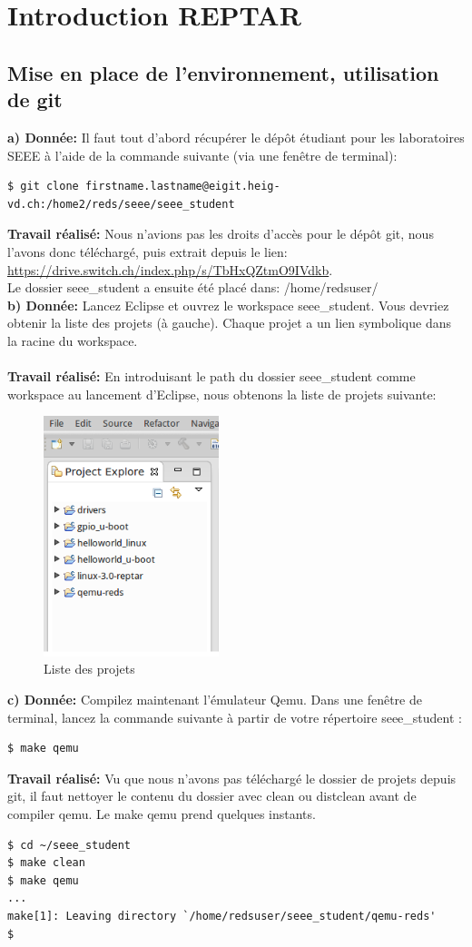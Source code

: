 \newpage
\section{Introduction REPTAR}
\subsection{Mise en place de l'environnement, utilisation de git}
\textbf{a) Donnée: }Il faut tout d'abord récupérer le dépôt étudiant pour les laboratoires SEEE à l'aide de la commande
suivante (via une fenêtre de terminal):
\begin{lstlisting}
$ git clone firstname.lastname@eigit.heig-vd.ch:/home2/reds/seee/seee_student
\end{lstlisting}
\textbf{Travail réalisé: }
Nous n'avions pas les droits d'accès pour le dépôt git, nous l'avons donc téléchargé, puis extrait depuis le lien:
\url{https://drive.switch.ch/index.php/s/TbHxQZtmO9IVdkb}.\\
Le dossier seee\_student a ensuite été placé dans: /home/redsuser/\\

\textbf{b) Donnée: }Lancez Eclipse et ouvrez le workspace seee\_student. Vous devriez obtenir la liste des projets (à
gauche). Chaque projet a un lien symbolique dans la racine du workspace. \\\\
\textbf{Travail réalisé: }
En introduisant le path du dossier seee\_student comme workspace au lancement d'Eclipse, nous obtenons la liste de projets suivante:
\begin{figure}[H]
	\begin{center}
		\includegraphics[height=7cm]{img/eclipseProjet.png}
		\caption{Liste des projets}
		\label{eclipseProjet}
	\end{center}
\end{figure}
\textbf{c) Donnée: }Compilez maintenant l'émulateur Qemu. Dans une fenêtre de terminal, lancez la commande
suivante à partir de votre répertoire seee\_student : 
\begin{lstlisting}
$ make qemu
\end{lstlisting}
\textbf{Travail réalisé: }
Vu que nous n'avons pas téléchargé le dossier de projets depuis git, il faut nettoyer le contenu du dossier avec clean ou distclean avant de compiler qemu. Le make qemu prend quelques instants.\\
\begin{lstlisting}
$ cd ~/seee_student
$ make clean
$ make qemu
...
make[1]: Leaving directory `/home/redsuser/seee_student/qemu-reds'
$
\end{lstlisting}
